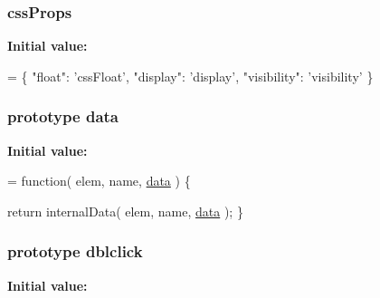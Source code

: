 \hypertarget{jquery-1_810_82-vsdoc_8js_a5bc8f2d604bc8e8a89fe5eaf624364e1}{
\subsubsection[{css\-Props}]{ css\-Props}}\label{jquery-1_810_82-vsdoc_8js_a5bc8f2d604bc8e8a89fe5eaf624364e1}
{\bfseries Initial value\-:}
\begin{DoxyCode}
= \{ \textcolor{stringliteral}{"float"}: \textcolor{stringliteral}{'cssFloat'},
\textcolor{stringliteral}{"display"}: \textcolor{stringliteral}{'display'},
\textcolor{stringliteral}{"visibility"}: \textcolor{stringliteral}{'visibility'} \}
\end{DoxyCode}
\hypertarget{jquery-1_810_82-vsdoc_8js_a609407b3456fdc3c5671a9fc4a226ff7}{
\subsubsection[{data}]{ {\bf prototype} data}}\label{jquery-1_810_82-vsdoc_8js_a609407b3456fdc3c5671a9fc4a226ff7}
{\bfseries Initial value\-:}
\begin{DoxyCode}
= \textcolor{keyword}{function}( elem, name, \hyperlink{jquery-1_810_82-vsdoc_8js_a609407b3456fdc3c5671a9fc4a226ff7}{data} ) \{


        \textcolor{keywordflow}{return} internalData( elem, name, \hyperlink{jquery-1_810_82-vsdoc_8js_a609407b3456fdc3c5671a9fc4a226ff7}{data} );
    \}
\end{DoxyCode}
\hypertarget{jquery-1_810_82-vsdoc_8js_a94c0d6e51790b913f3bcdb696d3d2863}{
\subsubsection[{dblclick}]{ {\bf prototype} dblclick}}\label{jquery-1_810_82-vsdoc_8js_a94c0d6e51790b913f3bcdb696d3d2863}
{\bfseries Initial value\-:}
